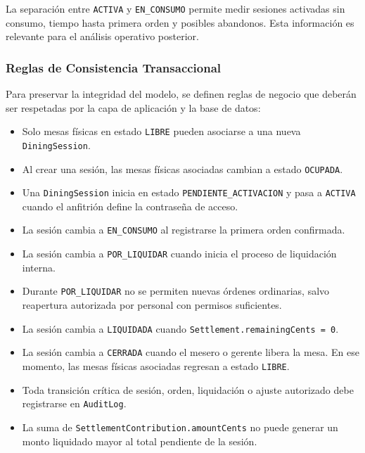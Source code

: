La separación entre \texttt{ACTIVA} y \texttt{EN\_CONSUMO} permite medir sesiones activadas
sin consumo, tiempo hasta primera orden y posibles abandonos. Esta información es relevante
para el análisis operativo posterior.

\subsubsection{Reglas de Consistencia Transaccional}

Para preservar la integridad del modelo, se definen reglas de negocio que deberán ser
respetadas por la capa de aplicación y la base de datos:

\begin{itemize}
  \item Solo mesas físicas en estado \texttt{LIBRE} pueden asociarse a una nueva
  \texttt{DiningSession}.

  \item Al crear una sesión, las mesas físicas asociadas cambian a estado
  \texttt{OCUPADA}.

  \item Una \texttt{DiningSession} inicia en estado \texttt{PENDIENTE\_ACTIVACION} y pasa
  a \texttt{ACTIVA} cuando el anfitrión define la contraseña de acceso.

  \item La sesión cambia a \texttt{EN\_CONSUMO} al registrarse la primera orden confirmada.

  \item La sesión cambia a \texttt{POR\_LIQUIDAR} cuando inicia el proceso de liquidación
  interna.

  \item Durante \texttt{POR\_LIQUIDAR} no se permiten nuevas órdenes ordinarias, salvo
  reapertura autorizada por personal con permisos suficientes.

  \item La sesión cambia a \texttt{LIQUIDADA} cuando \texttt{Settlement.remainingCents = 0}.

  \item La sesión cambia a \texttt{CERRADA} cuando el mesero o gerente libera la mesa.
  En ese momento, las mesas físicas asociadas regresan a estado \texttt{LIBRE}.

  \item Toda transición crítica de sesión, orden, liquidación o ajuste autorizado debe
  registrarse en \texttt{AuditLog}.

  \item La suma de \texttt{SettlementContribution.amountCents} no puede generar un monto
  liquidado mayor al total pendiente de la sesión.


\end{itemize}
